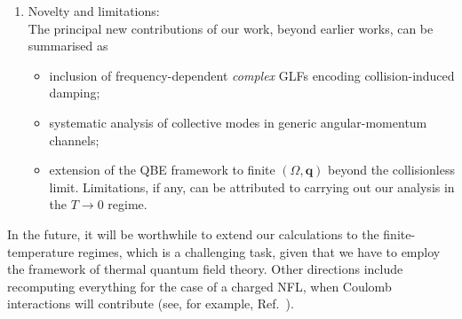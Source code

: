 \documentclass[aps, prb, onecolumn, nofootinbib, citeautoscript, 10pt]{revtex4-2}
\begin{document}
\begin{enumerate}
\\SYK-inspired models are based on large-$N$ formulation (e.g., Ref.~\cite{PhysRevB.103.235129}) and depend crucially on the large-$N$ limit. Their microscopic formulation is fundamentally different from working with the QFT-based action adopted here. We take the leading-order fermion-boson interaction describing the Ising-Nematic QCP and the controlled approximation dealing with this strongly-coupled theory is well-established within the dimensional-regularization scheme put forward in Refs.~\cite{Lee-Dalid, ips-uv-ir1}. Our QFT analysis has no dependence whatsoever on the number of flavours ($N$) of fermions and its validity is not contingent upon the large-$N$ limit. In particular, we have not found an exhaustive analysis of the collective modes of critical Fermi surfaces, including the full effects of the collision integrals like we have done, and neither is there a full explanation of the emergent collective modes quantified by their structure as well as $(\Omega, \, \mathbf q)$-dependence. In other words, our QBE framework is designed to address all these aspects in a holisitc way by incorporating the spatial structure, Fermi-surface geometry, energy-dependence, and finite-$\mathbf q $ dynamics, which are currently lacking in those SYK-based studies.
\item Novelty and limitations:
\\The principal new contributions of our work, beyond earlier works, can be summarised as
\begin{itemize}
\item inclusion of frequency-dependent \textit{complex} GLFs encoding collision-induced damping;
\item systematic analysis of collective modes in generic angular-momentum channels;
\item extension of the QBE framework to finite $(\Omega,\mathbf q)$ beyond the collisionless limit.
Limitations, if any, can be attributed to carrying out our analysis in the $T\rightarrow 0$ regime.
\end{itemize}
\end{enumerate} 
In the future, it will be worthwhile to extend our calculations to the finite-temperature regimes, which is a challenging task, given that we have to employ the framework of thermal quantum field theory. Other directions include recomputing everything for the case of a charged NFL, when Coulomb interactions will contribute (see, for example, Ref.~\cite{ips-zero-mode}).
	
\end{document}
